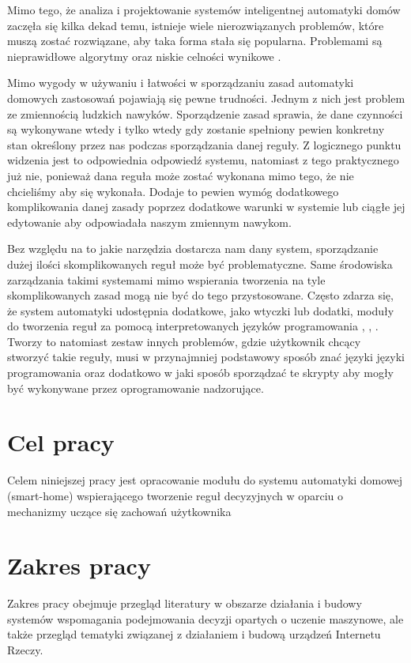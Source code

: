 Mimo tego, że analiza i projektowanie systemów inteligentnej automatyki domów zaczęła się kilka dekad temu, istnieje wiele nierozwiązanych problemów, które muszą zostać rozwiązane, aby taka forma stała się popularna. Problemami są nieprawidłowe algorytmy oraz niskie celności wynikowe \cite{episode_discovery_2}.

Mimo wygody w używaniu i łatwości w sporządzaniu zasad automatyki domowych zastosowań pojawiają się pewne trudności. Jednym z nich jest problem ze zmiennością ludzkich nawyków. Sporządzenie zasad sprawia, że dane czynności są wykonywane wtedy i tylko wtedy gdy zostanie spełniony pewien konkretny stan określony przez nas podczas sporządzania danej reguły. Z logicznego punktu widzenia jest to odpowiednia odpowiedź systemu, natomiast z tego praktycznego już nie, ponieważ dana reguła może zostać wykonana mimo tego, że nie chcieliśmy aby się wykonała. Dodaje to pewien wymóg dodatkowego komplikowania danej zasady poprzez dodatkowe warunki w systemie lub ciągłe jej edytowanie aby odpowiadała naszym zmiennym nawykom.

Bez względu na to jakie narzędzia dostarcza nam dany system, sporządzanie dużej ilości skomplikowanych reguł może być problematyczne. Same środowiska zarządzania takimi systemami mimo wspierania tworzenia na tyle skomplikowanych zasad mogą nie być do tego przystosowane. Często zdarza się, że system automatyki udostępnia dodatkowe, jako wtyczki lub dodatki, moduły do tworzenia reguł za pomocą interpretowanych języków programowania \cite{appdaemon:main}, \cite{domoticz:scripts}, \cite{openhab:scripts}. Tworzy to natomiast zestaw innych problemów, gdzie użytkownik chcący stworzyć takie reguły, musi w przynajmniej podstawowy sposób znać języki języki programowania oraz dodatkowo w jaki sposób sporządzać te skrypty aby mogły być wykonywane przez oprogramowanie nadzorujące.



\section{Cel pracy}
Celem niniejszej pracy jest opracowanie modułu do systemu automatyki domowej (smart-home) wspierającego tworzenie reguł decyzyjnych w oparciu o mechanizmy uczące się zachowań użytkownika


\section{Zakres pracy}
Zakres pracy obejmuje przegląd literatury w obszarze działania i budowy systemów wspomagania podejmowania decyzji opartych o uczenie maszynowe, ale także przegląd tematyki związanej z działaniem i budową urządzeń Internetu Rzeczy.

